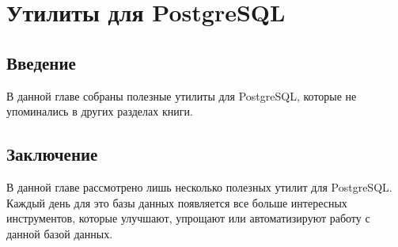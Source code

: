 \chapter{Утилиты для PostgreSQL}

\begin{epigraphs}
\end{epigraphs}

\section{Введение}

В данной главе собраны полезные утилиты для PostgreSQL, которые не упоминались в других разделах книги.








\section{Заключение}

В данной главе рассмотрено лишь несколько полезных утилит для PostgreSQL. Каждый день для это базы данных появляется все больше интересных инструментов, которые улучшают, упрощают или автоматизируют работу с данной базой данных.
